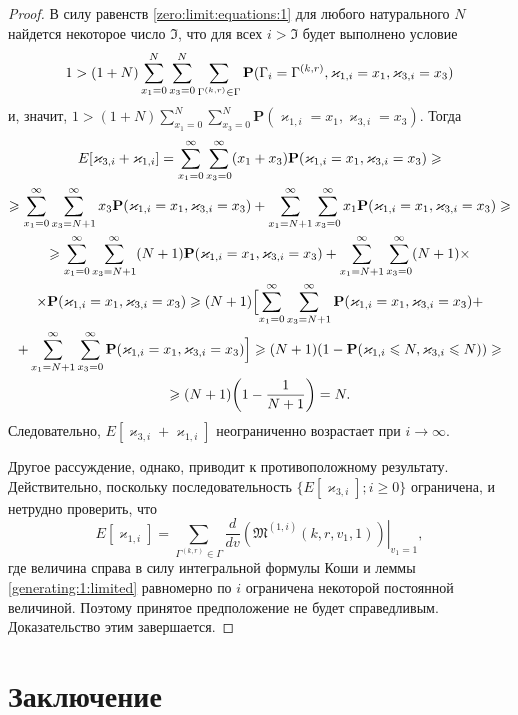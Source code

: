 \documentclass[12pt]{extarticle}
\theoremstyle{theorem}
\theoremstyle{remark}
\renewcommand*{\hm}[1]{#1\nobreak\discretionary{}%
	{\hbox{$\mathsurround=0pt #1$}}{}}%
\renewcommand{\Pr}{{\mathbf P}}
\begin{document}
\begin{proof}
В силу равенств \eqref{zero:limit:equations:1} для любого натурального $N$ найдется некоторое число $\mathfrak{I}$, что для всех $i > \mathfrak{I}$ будет выполнено условие
$$1 > (1+N) \sum_{x_1=0}^{N}\sum_{x_3=0}^{N} \sum_{\Gamma^{(k,r)}\in \Gamma}  \Pr(\Gamma_{i}=\Gamma^{(k,r)}, \varkappa_{1,i} \hm{} = x_1, \varkappa_{3,i}=x_3)$$
и, значит, $1 >(1+N) \sum_{x_1=0}^{N}\sum_{x_3=0}^{N} \Pr(\varkappa_{1,i} = x_1, \varkappa_{3,i}=x_3)$. Тогда
\begin{multline*}
E[\varkappa_{3,i}+\varkappa_{1,i}] = \sum_{x_1=0}^{\infty}\sum_{x_3=0}^{\infty} (x_1 + x_3) \Pr(\varkappa_{1,i} = x_1, \varkappa_{3,i}=x_3) \geqslant \\
\geqslant
 \sum_{x_1=0}^{\infty}\sum_{x_3=N+1}^{\infty} x_3 \Pr(\varkappa_{1,i} = x_1, \varkappa_{3,i}=x_3) +  \sum_{x_1=N+1}^{\infty}\sum_{x_3=0}^{\infty} x_1 \Pr(\varkappa_{1,i} = x_1, \varkappa_{3,i}=x_3) \geqslant \\
 \geqslant
  \sum_{x_1=0}^{\infty}\sum_{x_3=N+1}^{\infty} (N+1) \Pr(\varkappa_{1,i} = x_1, \varkappa_{3,i}=x_3) + \sum_{x_1=N+1}^{\infty}\sum_{x_3=0}^{\infty} (N+1) \times \\ \times \Pr(\varkappa_{1,i} = x_1, \varkappa_{3,i}=x_3)
  \geqslant
  (N+1)\Bigl[\sum_{x_1=0}^{\infty}\sum_{x_3=N+1}^{\infty} \Pr(\varkappa_{1,i} = x_1, \varkappa_{3,i}=x_3) + \\+ \sum_{x_1=N+1}^{\infty}\sum_{x_3=0}^{\infty}\Pr(\varkappa_{1,i} = x_1, \varkappa_{3,i}=x_3)\Bigr] 
  \geqslant (N+1)(1-\Pr(\varkappa_{1,i} \leqslant N, \varkappa_{3,i} \leqslant N)  ) 
  \geqslant \\ \geqslant
  (N+1)\biggl(1-\frac{1}{N+1}\biggr) = N.
\end{multline*}
Следовательно, $E[\varkappa_{3,i}+\varkappa_{1,i}]$ неограниченно возрастает при $i \to \infty$. 

Другое рассуждение, однако, приводит к противоположному результату. Действительно, поскольку последовательность $\{E[\varkappa_{3,i}]; i \geqslant 0\}$ ограничена, и нетрудно проверить, что
$$
E[\varkappa_{1,i}] =\sum_{\Gamma^{(k,r)}\in \Gamma} \frac{d}{dv}\left.\left(\mathfrak{M}^{(1,i)}(k,r,v_1,1)\right)\right|_{v_1=1},
$$
где величина справа в силу интегральной формулы Коши и леммы \ref{generating:1:limited} равномерно по $i$ ограничена некоторой постоянной величиной. 
 Поэтому принятое предположение не будет справедливым. Доказательство этим завершается.
\end{proof}



\section{Заключение}
\end{document}
